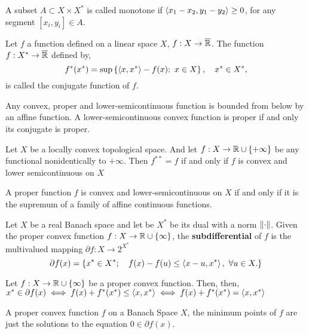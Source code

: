 A subset $A\subset X\times X^*$ is called monotone if $\left\langle x_1-x_2, y_1-y_2 \right\rangle\geq 0$, for any segment $[x_i, y_i]\in A$.
\begin{definition}
	Let $f$ a function defined on a linear space $X$, $f:X\to\overline{\mathbb{R}}$. The function $f:X^*\to\overline{\mathbb{R}}$ defined by,
	\begin{equation}
		f^*(x^*)=\sup\braces{\anglesbox{x,x^*}-f(x);\ x\in X}, \quad x^*\in X^*,
	\end{equation} is called the conjugate function of $f$. 
\end{definition}

Any convex, proper and lower-semicontinuous function is bounded from below by an affine function. A lower-semicontinuous convex function is proper if and only its conjugate is proper. 
\begin{theorem}
Let $X$ be a locally convex topological space. And let $f:X\rightarrow \mathbb{R}\cup\left\lbrace +\infty \right\rbrace$ be any functional nonidentically to $+\infty$. Then $f^{**}=f$ if and only if $f$ is convex and lower semicontinuous on $X$	
\end{theorem}

A proper function $f$ is convex and lower-semicontinuous on $X$ if and only if it is the supremum of a family of affine continuous functions.

\begin{definition}[Subdifferential]
	Let $X$ be a real Banach space and let be $X^*$ be its dual with a norm $\left\|\cdot\right\|$. Given the proper convex function $f:X\rightarrow \mathbb{R}\cup\left\lbrace \infty \right\rbrace$, the \textbf{subdifferential} of $f$  is the multivalued mapping $\partial f:X\to2^{X^*}$
	\begin{equation*}
		\partial f(x)=\left\lbrace x^*\in X^*;\quad f(x)-f(u)\leq \left\langle x-u, x^* \right\rangle,\ \forall u \in X. \right\rbrace		
	\end{equation*}
\end{definition}

\begin{theorem}
	Let $f:X\to\mathbb{R}\cup\left\lbrace \infty \right\rbrace$ be a proper convex function. Then, then, $x^*\in\partial f(x)\iff f(x)+f^*(x^*)\leq\left\langle x, x^* \right\rangle\iff f(x)+f^*(x^*)=\left\langle x, x^* \right\rangle$
\end{theorem}
A proper convex function $f$ on a Banach Space $X$, the minimum points of $f$ are just the solutions to the equation  $0\in\partial f(x)$.




